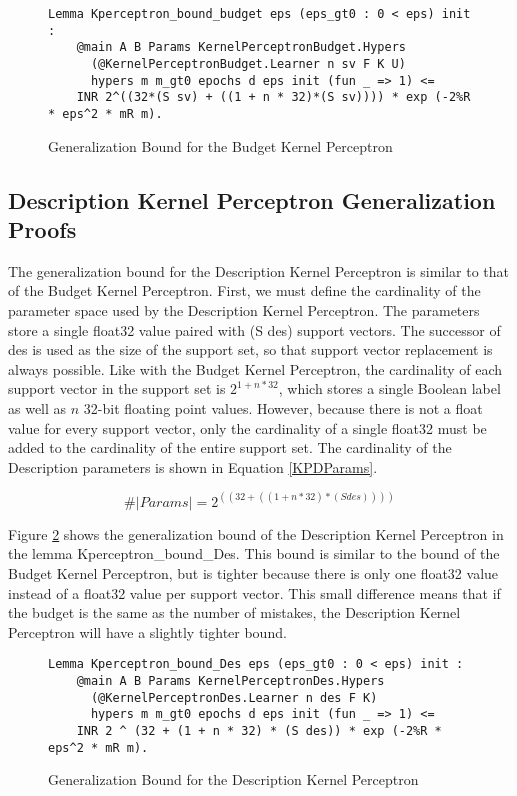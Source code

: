 \begin{figure}
    \caption{Generalization Bound for the Budget Kernel Perceptron}
    \label{KPBLemma}
    \begin{lstlisting}
Lemma Kperceptron_bound_budget eps (eps_gt0 : 0 < eps) init : 
    @main A B Params KernelPerceptronBudget.Hypers 
      (@KernelPerceptronBudget.Learner n sv F K U)
      hypers m m_gt0 epochs d eps init (fun _ => 1) <=
    INR 2^((32*(S sv) + ((1 + n * 32)*(S sv)))) * exp (-2%R * eps^2 * mR m).
    \end{lstlisting}
\end{figure}

\subsection{Description Kernel Perceptron Generalization Proofs}\label{KPDProofs}

The generalization bound for the Description Kernel Perceptron is similar to that of the Budget Kernel Perceptron. First, we must define the cardinality of the parameter space used by the Description Kernel Perceptron. The parameters store a single float32 value paired with (S des) support vectors. The successor of des is used as the size of the support set, so that support vector replacement is always possible. Like with the Budget Kernel Perceptron, the cardinality of each support vector in the support set is $2^{1 + n * 32}$, which stores a single Boolean label as well as $n$ 32-bit floating point values. However, because there is not a float value for every support vector, only the cardinality of a single float32 must be added to the cardinality of the entire support set. The cardinality of the Description parameters is shown in Equation \ref{KPDParams}.

\begin{equation} \label{KPDParams}
 \#|Params| = 2^{((32 + ((1 + n * 32)*(S des))))}
\end{equation}

Figure \ref{KPDLemma} shows the generalization bound of the Description Kernel Perceptron in the lemma Kperceptron\_bound\_Des. This bound is similar to the bound of the Budget Kernel Perceptron, but is tighter because there is only one float32 value instead of a float32 value per support vector. This small difference means that if the budget is the same as the number of mistakes, the Description Kernel Perceptron will have a slightly tighter bound. 

\begin{figure}
    \caption{Generalization Bound for the Description Kernel Perceptron}
    \label{KPDLemma}
    \begin{lstlisting}
Lemma Kperceptron_bound_Des eps (eps_gt0 : 0 < eps) init : 
    @main A B Params KernelPerceptronDes.Hypers 
      (@KernelPerceptronDes.Learner n des F K)
      hypers m m_gt0 epochs d eps init (fun _ => 1) <=
    INR 2 ^ (32 + (1 + n * 32) * (S des)) * exp (-2%R * eps^2 * mR m).
    \end{lstlisting}
\end{figure}


